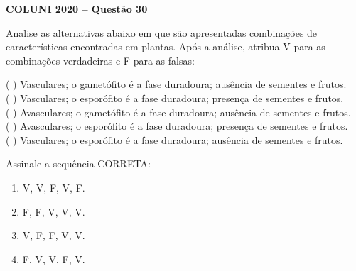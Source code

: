 \textbf{COLUNI 2020 -- Questão 30}\par\medskip Analise as alternativas abaixo em que são apresentadas combinações de características encontradas em plantas. Após a análise, atribua V para as combinações verdadeiras e F para as falsas:

\par

(   ) Vasculares; o gametófito é a fase duradoura; ausência de sementes e frutos. \\
(   ) Vasculares; o esporófito é a fase duradoura; presença de sementes e frutos. \\
(   ) Avasculares; o gametófito é a fase duradoura; ausência de sementes e frutos. \\
(   ) Avasculares; o esporófito é a fase duradoura; presença de sementes e frutos. \\
(   ) Vasculares; o esporófito é a fase duradoura; ausência de sementes e frutos.

\par

Assinale a sequência CORRETA:\begin{enumerate}
\item V, V, F, V, F.
\item F, F, V, V, V.
\item V, F, F, V, V.
\item F, V, V, F, V.

\end{enumerate}

